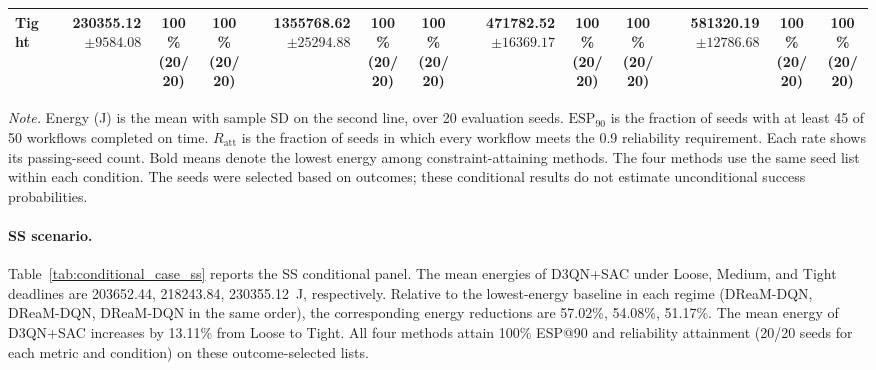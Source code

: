 \documentclass[10pt]{article}
\begin{document}
\begin{table}[!htbp]
\begin{tabular}{@{}l*{4}{rcc}@{}}
Tight & \shortstack[r]{\textbf{230355.12}\\$\pm 9584.08$} & \shortstack[c]{100\%\\(20/20)} & \shortstack[c]{100\%\\(20/20)} & \shortstack[r]{1355768.62\\$\pm 25294.88$} & \shortstack[c]{100\%\\(20/20)} & \shortstack[c]{100\%\\(20/20)} & \shortstack[r]{471782.52\\$\pm 16369.17$} & \shortstack[c]{100\%\\(20/20)} & \shortstack[c]{100\%\\(20/20)} & \shortstack[r]{581320.19\\$\pm 12786.68$} & \shortstack[c]{100\%\\(20/20)} & \shortstack[c]{100\%\\(20/20)} \\
\bottomrule
\end{tabular}
\par\vspace{3pt}
\parbox{\textwidth}{\footnotesize
\textit{Note.} Energy (J) is the mean with sample SD on the second line, over 20 evaluation seeds.
$\mathrm{ESP}_{90}$ is the fraction of seeds with at least 45 of 50 workflows completed on time.
$R_{\mathrm{att}}$ is the fraction of seeds in which every workflow meets the 0.9 reliability requirement.
Each rate shows its passing-seed count. Bold means denote the lowest energy among constraint-attaining methods.
The four methods use the same seed list within each condition.
The seeds were selected based on outcomes; these conditional results do not estimate unconditional success probabilities.}
\endgroup
\end{table}

\paragraph{SS scenario.}
Table~\ref{tab:conditional_case_ss} reports the SS conditional panel. The mean energies of D3QN+SAC under Loose, Medium, and Tight deadlines are 203652.44, 218243.84, 230355.12~J, respectively. Relative to the lowest-energy baseline in each regime (DReaM-DQN, DReaM-DQN, DReaM-DQN in the same order), the corresponding energy reductions are 57.02\%, 54.08\%, 51.17\%. The mean energy of D3QN+SAC increases by 13.11\% from Loose to Tight. All four methods attain 100\% ESP@90 and reliability attainment (20/20 seeds for each metric and condition) on these outcome-selected lists.
\end{document}
